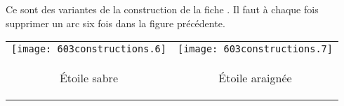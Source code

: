 \begin{cursive} Ce sont des variantes de la construction de la fiche . Il faut à chaque fois supprimer un arc six fois dans la figure précédente.
\end{cursive}
\begin{center}
\begin{tabular}{cc}
\texttt{[image: 603constructions.6]}&\texttt{[image: 603constructions.7]}\\
\begin{cursive}\'Etoile sabre\end{cursive}&\begin{cursive}\'Etoile araignée\end{cursive}\\
\end{tabular}
\end{center}

